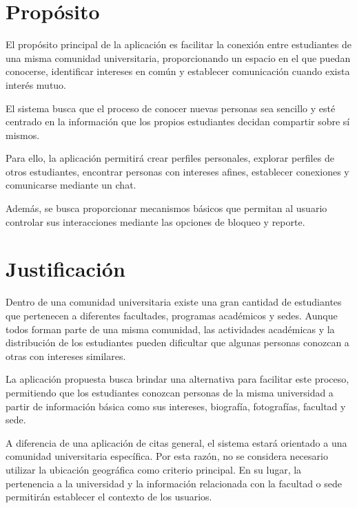 \documentclass[11pt,a4paper]{article}
\begin{document}
\section{Propósito}

El propósito principal de la aplicación es facilitar la conexión entre estudiantes
de una misma comunidad universitaria, proporcionando un espacio en el que puedan
conocerse, identificar intereses en común y establecer comunicación cuando exista
interés mutuo.

El sistema busca que el proceso de conocer nuevas personas sea sencillo y esté
centrado en la información que los propios estudiantes decidan compartir sobre sí
mismos.

Para ello, la aplicación permitirá crear perfiles personales, explorar perfiles
de otros estudiantes, encontrar personas con intereses afines, establecer
conexiones y comunicarse mediante un chat.

Además, se busca proporcionar mecanismos básicos que permitan al usuario controlar
sus interacciones mediante las opciones de bloqueo y reporte.


\section{Justificación}

Dentro de una comunidad universitaria existe una gran cantidad de estudiantes que
pertenecen a diferentes facultades, programas académicos y sedes. Aunque todos
forman parte de una misma comunidad, las actividades académicas y la distribución
de los estudiantes pueden dificultar que algunas personas conozcan a otras con
intereses similares.

La aplicación propuesta busca brindar una alternativa para facilitar este proceso,
permitiendo que los estudiantes conozcan personas de la misma universidad a partir
de información básica como sus intereses, biografía, fotografías, facultad y sede.

A diferencia de una aplicación de citas general, el sistema estará orientado a una
comunidad universitaria específica. Por esta razón, no se considera necesario
utilizar la ubicación geográfica como criterio principal. En su lugar, la
pertenencia a la universidad y la información relacionada con la facultad o sede
permitirán establecer el contexto de los usuarios.
\end{document}
